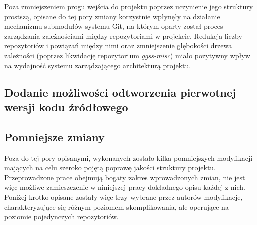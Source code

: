 
Poza zmniejszeniem progu wejścia do projektu poprzez uczynienie jego struktury prostszą, opisane do tej pory zmiany korzystnie wpłynęły na działanie mechanizmu submodułów systemu Git, na którym oparty został proces zarządzania zależnościami między repozytoriami w projekcie. Redukcja liczby repozytoriów i powiązań między nimi oraz zmniejszenie głębokości drzewa zależności (poprzez likwidację repozytorium \emph{ggss-misc}) miało pozytywny wpływ na wydajność systemu zarządzającego architekturą projektu. 



\subsection{Dodanie możliwości odtworzenia pierwotnej wersji kodu źródłowego}

\subsection{Pomniejsze zmiany}
Poza do tej pory opisanymi, wykonanych zostało kilka pomniejszych modyfikacji mających na celu szeroko pojętą poprawę jakości struktury projektu. Przeprowadzone prace obejmują bogaty zakres wprowadzonych zmian, nie jest więc możliwe zamieszczenie w niniejszej pracy dokładnego opisu każdej z nich. Poniżej krotko opisane zostały więc trzy wybrane przez autorów modyfikacje, charakteryzujące się różnym poziomem skomplikowania, ale operujące na poziomie pojedynczych repozytoriów. 

